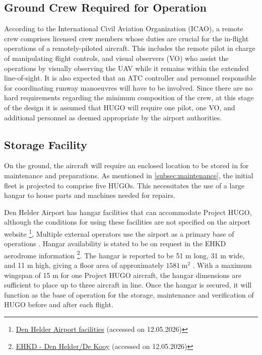 \subsection{Ground Crew Required for Operation}
\label{subsec:ground_crew}
According to the International Civil Aviation Organization (ICAO)\cite{ICAO2011UAS}, a remote crew comprises licensed crew members whose duties are crucial for the in-flight operations of a remotely-piloted
aircraft. This includes the remote pilot in charge of manipulating flight controls, and visual observers (VO) who assist the operations by visually observing the UAV while it remains within the extended line-of-sight. It is also expected that an ATC controller and personnel responsible for coordinating runway manoeuvres will have to be involved. Since there are no hard requirements regarding the minimum composition of the crew, at this stage of the design it is assumed that HUGO will require one pilot, one VO, and additional personnel as deemed appropriate by the airport authorities.

\subsection{Storage Facility}
\label{subsec:hangar}
On the ground, the aircraft will require an enclosed location to be stored in for maintenance and preparations. As mentioned in \autoref{subsec:maintenance}, the initial fleet is projected to comprise five HUGOs. This necessitates the use of a large hangar to house parts and machines needed for repairs. 

Den Helder Airport has hangar facilities that can accommodate Project HUGO, although the conditions for using these facilities are not specified on the airport website \footnote{\label{fn:denhelder_facilities}\href{https://denhelderairport.nl/eng/airport/#faciliteiten}{Den Helder Airport facilities} (accessed on 12.05.2026)}, Multiple external operators use the airport as a primary base of operations . Hangar availability is stated to be on request in the EHKD aerodrome information \footnote{\label{fn:ehkd_eaip}\href{https://eaip.lvnl.nl/web/eaip/AIRAC\%20AMDT\%2005-2026_2026_05_14/eAIP/EH-AD\%202\%20EHKD\%201-en-GB.html}{EHKD - Den Helder/De Kooy} (accessed on 12.05.2026)}. The hangar is reported to be 51 m long, 31 m wide, and 11 m high, giving a floor area of approximately \(1581~\mathrm{m^2}\) \cite{DenHelderAirport2013DHANieuwsbrief}. With a maximum wingspan of 15 m for one Project HUGO aircraft, the hangar dimensions are sufficient to place up to three aircraft in line. Once the hangar is secured, it will function as the base of operation for the storage, maintenance and verification of HUGO before and after each flight. 

